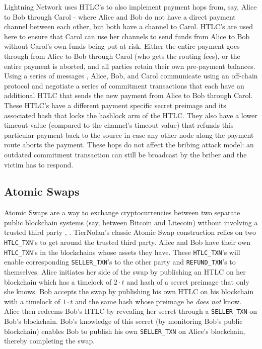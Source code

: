 \documentclass[runningheads]{llncs}
\newcommand{\htlctxn}{\texttt{HTLC\_TXN}}
\newcommand{\sellertxn}{\texttt{SELLER\_TXN}}
\newcommand{\refundtxn}{\texttt{REFUND\_TXN}}
\begin{document}
Lightning Network uses HTLC's to also implement payment hops from, say, Alice to Bob through Carol - where Alice and Bob do not have a direct payment channel between each other, but both have a channel to Carol. HTLC's are used here to ensure that Carol can use her channels to send funds from Alice to Bob without Carol's own funds being put at risk. Either the entire payment goes through from Alice to Bob through Carol (who gets the routing fees), or the entire payment is aborted, and all parties retain their own pre-payment balances. Using a series of messages \cite{bolt_3}, Alice, Bob, and Carol communicate using an off-chain protocol and negotiate a series of commitment transactions that each have an additional HTLC that sends the new payment from Alice to Bob through Carol. These HTLC's have a different payment specific secret preimage and its associated hash that locks the hashlock arm of the HTLC. They also have a lower timeout value (compared to the channel's timeout value) that refunds this particular payment back to the source in case any other node along the payment route aborts the payment. These hops do not affect the bribing attack model: an outdated commitment transaction can still be broadcast by the briber and the victim has to respond.

\subsection{Atomic Swaps}
Atomic Swaps are a way to exchange cryptocurrencies between two separate public blockchain systems (say, between Bitcoin and Litecoin) without involving a trusted third party \cite{herlihy2018atomic}, \cite{atomic_swaps_american_call_options}. TierNolan's classic Atomic Swap construction \cite{atomic_swap} relies on two \htlctxn's to get around the trusted third party. Alice and Bob have their own \htlctxn's in the blockchains whose assets they have. These \htlctxn's will enable corresponding \sellertxn{}'s to the other party and \refundtxn{}'s to themselves. Alice initiates her side of the swap by publishing an HTLC on her blockchain which has a timelock of $2\cdot t$ and hash of a secret preimage that only she knows. Bob accepts the swap by publishing his own HTLC on his blockchain with a timelock of $1\cdot t$ and the same hash whose preimage he \emph{does not} know. Alice then redeems Bob's HTLC by revealing her secret through a \sellertxn{} on Bob's blockchain. Bob's knowledge of this secret (by monitoring Bob's public blockchain) enables Bob to publish his own \sellertxn{} on Alice's blockchain, thereby completing the swap. 
\end{document}
